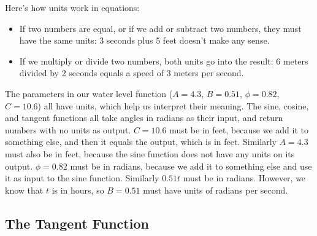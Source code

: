 \begin{callout}
    Here's how units work in equations:  
    \begin{itemize}
        \item If two numbers are equal, or if we add or subtract
            two numbers, they must have the same units:  3 seconds plus 5 feet doesn't make any sense.
        \item If we multiply or divide two numbers, both units go into the result:  6 meters divided by
            2 seconds equals a speed of 3 meters per second. 
    \end{itemize}
\end{callout}

The parameters in our water level function ($A = 4.3$, $B = 0.51$, $\phi = 0.82$, $C =
10.6$) all have units, which help us interpret their meaning.   The sine, cosine, and
tangent functions all take angles in radians as their input, and return numbers with no
units as output.  $C = 10.6$ must be in feet, because we add it to something else, and
then it equals the output, which is in feet.  Similarly $A = 4.3$ must also be in feet,
because the sine function does not have any units on its output.  $\phi = 0.82$ must be in
radians, because we add it to something else and use it as input to the sine function.
Similarly $0.51 t$ must be in radians.  However, we know that $t$ is in hours, so $B =
0.51$ must have units of radians per second.  












\subsection*{The Tangent Function}

